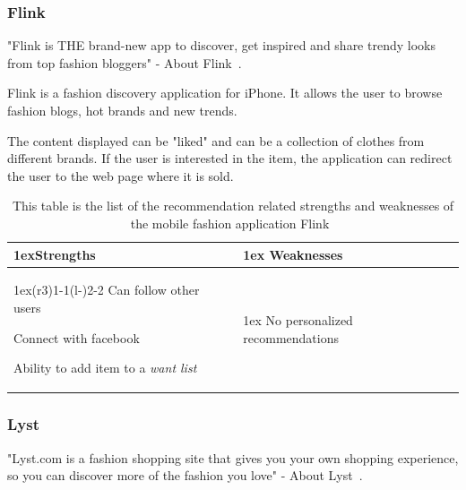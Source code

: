 \subsubsection{Flink} %
\label{par:flink}
    "Flink is THE brand-new app to discover, get inspired and share trendy looks from top fashion bloggers" - About Flink~\cite{flink}.

    Flink is a fashion discovery application for iPhone.
    It allows the user to browse fashion blogs, hot brands and new trends.

    The content displayed can be "liked" and can be a collection of clothes from different brands.
    If the user is interested in the item, the application can redirect the user to the web page where it is sold.
    \begin{table}[H]
            \centering
            \begin{tabularx}{\linewidth}{>{\parskip1ex}X@{\kern4\tabcolsep}>{\parskip1ex}X}
                \toprule
                \hfil\bfseries Strengths
                &
                \hfil\bfseries Weaknesses
                \\\cmidrule(r{3\tabcolsep}){1-1}\cmidrule(l{-\tabcolsep}){2-2}
                Can follow other users \par
                Connect with facebook \par
                Ability to add item to a \emph{want list} \par
                &
                No personalized recommendations \par
                \\\bottomrule
                \end{tabularx}
        \caption[Recommendation related strengths and weaknesses of Flink~\cite{flink}]{This table is the list of the recommendation related strengths and weaknesses of the mobile fashion application Flink~\cite{flink}}
        \label{table:iphoneAppFlink}
    \end{table}

\subsubsection{Lyst} %
\label{par:lyst}
    "Lyst.com is a fashion shopping site that gives you your own shopping experience, so you can discover more of the fashion you love" - About Lyst~\cite{lyst}.

